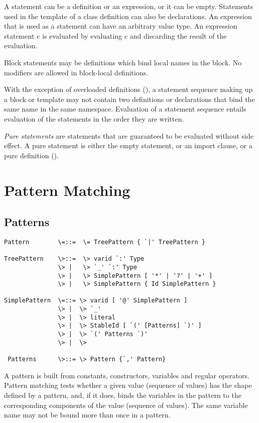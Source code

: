 \documentclass[11pt]{report}
\begin{document}
A statement can be a definition or an expression, or it can be empty.
Statements used in the template of a class definition can also be
declarations.  An expression that is used as a statement can have an
arbitrary value type. An expression statement $e$ is evaluated by
evaluating $e$ and discarding the result of the evaluation.

Block statements may be definitions which bind local names in the
block. No modifiers are allowed in block-local definitions.

With the exception of overloaded definitions
(), a statement sequence making up a block
or template may not contain two definitions or declarations that bind
the same name in the same namespace.  Evaluation of a statement
sequence entails evaluation of the statements in the order they are
written.

{\em Pure statements} are statements that are guaranteed to be
evaluated without side effect. A pure statement is either the empty
statement, or an import clause, or a pure definition ().

\chapter{Pattern Matching}

\section{Patterns}


\label{sec:patterns}

\syntax\begin{verbatim}
Pattern        \=::=  \= TreePattern { `|' TreePattern }

TreePattern    \>::=  \> varid `:' Type
               \> |   \> `_' `:' Type
               \> |   \> SimplePattern [ '*' | '?' | '+' ]
               \> |   \> SimplePattern { Id SimplePattern }

SimplePattern  \=::= \> varid [ '@' SimplePattern ]
               \> |  \> `_'
               \> |  \> literal
               \> |  \> StableId [ `(' [Patterns] `)' ]
               \> |  \> `(' Patterns `)'
               \> |  \> 

 Patterns      \>::= \> Pattern {`,' Pattern}
\end{verbatim}

A pattern is built from constants, constructors, variables and regular
operators. Pattern matching tests whether a given value (sequence
of values) has the shape defined by a pattern, and, if it does, binds
the variables in the pattern to the corresponding components of the
value (sequence of values).  The same variable name may not be
bound more than once in a pattern.
\end{document}
